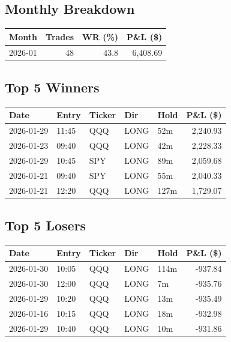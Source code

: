 \documentclass[11pt,a4paper,twoside]{article}
\begin{document}
\subsection{Monthly Breakdown}
\noindent\begin{center}
\begin{tabular}{>{\color{txtmain}}l rrr}
\toprule
\rowcolor{cardbg}
\textbf{Month} & \textbf{Trades} & \textbf{WR (\%)} & \textbf{P\&L (\$)} \\
\midrule
2026-01 & 48 & 43.8 & \textcolor{wingreen}{6,408.69} \\
\bottomrule
\end{tabular}
\end{center}
\subsection{Top 5 Winners}
\noindent\begin{center}
\begin{tabular}{>{\color{txtmain}}l llll r}
\toprule
\rowcolor{cardbg}
\textbf{Date} & \textbf{Entry} & \textbf{Ticker} & \textbf{Dir} & \textbf{Hold} & \textbf{P\&L (\$)} \\
\midrule
2026-01-29 & 11:45 & QQQ & LONG & 52m & \textcolor{wingreen}{2,240.93} \\
2026-01-23 & 09:40 & QQQ & LONG & 42m & \textcolor{wingreen}{2,228.33} \\
2026-01-29 & 10:45 & SPY & LONG & 89m & \textcolor{wingreen}{2,059.68} \\
2026-01-21 & 09:40 & SPY & LONG & 55m & \textcolor{wingreen}{2,040.33} \\
2026-01-21 & 12:20 & QQQ & LONG & 127m & \textcolor{wingreen}{1,729.07} \\
\bottomrule
\end{tabular}
\end{center}
\subsection{Top 5 Losers}
\noindent\begin{center}
\begin{tabular}{>{\color{txtmain}}l llll r}
\toprule
\rowcolor{cardbg}
\textbf{Date} & \textbf{Entry} & \textbf{Ticker} & \textbf{Dir} & \textbf{Hold} & \textbf{P\&L (\$)} \\
\midrule
2026-01-30 & 10:05 & QQQ & LONG & 114m & \textcolor{lossred}{-937.84} \\
2026-01-30 & 12:00 & QQQ & LONG & 7m & \textcolor{lossred}{-935.76} \\
2026-01-29 & 10:20 & QQQ & LONG & 13m & \textcolor{lossred}{-935.49} \\
2026-01-16 & 10:15 & QQQ & LONG & 18m & \textcolor{lossred}{-932.98} \\
2026-01-29 & 10:40 & QQQ & LONG & 10m & \textcolor{lossred}{-931.86} \\
\bottomrule
\end{tabular}
\end{center}
\clearpage
\end{document}

